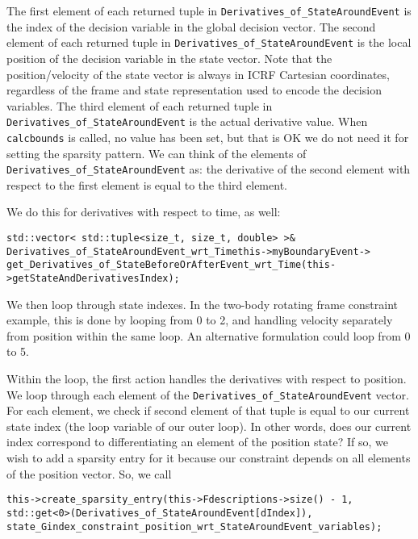 \documentclass[11pt]{article}
\begin{document}
\noindent The first element of each returned tuple in \texttt{Derivatives\_of\_StateAroundEvent} is the index of the decision variable in the global decision vector. The second element of each returned tuple in \texttt{Derivatives\_of\_StateAroundEvent} is the local position of the decision variable in the state vector. Note that the position/velocity of the state vector is always in ICRF Cartesian coordinates, regardless of the frame and state representation used to encode the decision variables. The third element of each returned tuple in \texttt{Derivatives\_of\_StateAroundEvent} is the actual derivative value. When \texttt{calcbounds} is called, no value has been set, but that is OK \textemdash we do not need it for setting the sparsity pattern. We can think of the elements of \texttt{Derivatives\_of\_StateAroundEvent} as: the derivative of the second element with respect to the first element is equal to the third element.

We do this for derivatives with respect to time, as well:

\begin{verbatim}
std::vector< std::tuple<size_t, size_t, double> >& 
Derivatives_of_StateAroundEvent_wrt_Timethis->myBoundaryEvent->
get_Derivatives_of_StateBeforeOrAfterEvent_wrt_Time(this->getStateAndDerivativesIndex);
\end{verbatim}

We then loop through state indexes. In the two-body rotating frame constraint example, this is done by looping from 0 to 2, and handling velocity separately from position within the same loop. An alternative formulation could loop from 0 to 5.

Within the loop, the first action handles the derivatives with respect to position. We loop through each element of the \texttt{Derivatives\_of\_StateAroundEvent} vector. For each element, we check if second element of that tuple is equal to our current state index (the loop variable of our outer loop). In other words, does our current index correspond to differentiating an element of the position state? If so, we wish to add a sparsity entry for it because our constraint depends on all elements of the position vector. So, we call

\begin{verbatim}
this->create_sparsity_entry(this->Fdescriptions->size() - 1,
std::get<0>(Derivatives_of_StateAroundEvent[dIndex]),
state_Gindex_constraint_position_wrt_StateAroundEvent_variables);
\end{verbatim}
\end{document}
